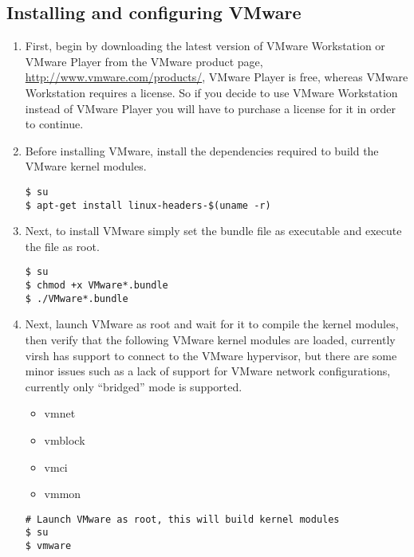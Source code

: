\subsection{Installing and configuring VMware}
\label{sec:debianvmware}
\begin{enumerate}
\item	First, begin by downloading the latest version of VMware Workstation or VMware Player  from the VMware product 
			page, \url{http://www.vmware.com/products/}, VMware Player is free, whereas VMware Workstation requires a
			license. So if you decide to use VMware Workstation instead of VMware Player you will have to purchase a license
			for it in order to continue.

\item	Before installing VMware, install the dependencies required to build the VMware kernel modules.

\lstset{language=bash,caption=Install VMware Dependencies}
\begin{lstlisting}
$ su
$ apt-get install linux-headers-$(uname -r)
\end{lstlisting}
		
\item 	Next, to install VMware simply set the bundle file as executable and execute the file as root.
\lstset{language=bash,caption=Install VMware}
\begin{lstlisting}
$ su
$ chmod +x VMware*.bundle
$ ./VMware*.bundle
\end{lstlisting}

\item	Next, launch VMware as root and wait for it to compile the kernel modules, then verify that the following VMware 
			kernel modules are loaded, currently virsh has support to connect to the VMware hypervisor, but there are some minor
			issues such as a lack of support for VMware network configurations, currently only ``bridged'' mode is supported.
		
\begin{itemize}
\item        vmnet
\item        vmblock
\item        vmci
\item        vmmon

\end{itemize}

\lstset{language=bash,caption=Verify VMware Kernel Extensions Loaded}
\begin{lstlisting}
# Launch VMware as root, this will build kernel modules
$ su
$ vmware


\end{lstlisting}
\end{enumerate}
